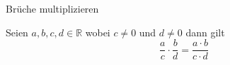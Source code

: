 %


\begin{theorem}{Brüche multiplizieren}
    \leanok

Seien $a,b,c,d \in \mathbb{R}$ wobei $c \neq 0$ und $d \neq 0$ dann gilt
$$
\frac{a}{c} \cdot \frac{b}{d} = \frac{a \cdot b}{c \cdot d}
$$

\end{theorem}
    

%
